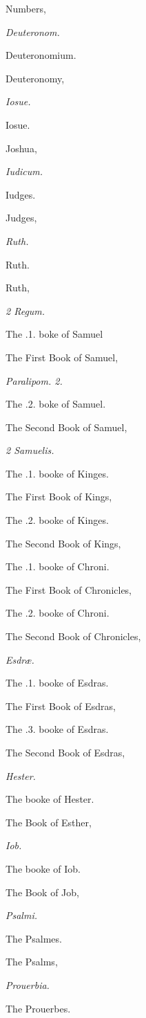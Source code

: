 Numbers,

\emph{Deuteronom.}

Deuteronomium.

Deuteronomy,

\emph{Iosue.}

Iosue.

Joshua,

\emph{Iudicum.}

Iudges.

Judges,

\emph{Ruth.}

Ruth.

Ruth,

\emph{2 Regum.}

The .1. boke of Samuel

The First Book of Samuel,

\emph{Paralipom. 2.}

The .2. boke of Samuel.

The Second Book of Samuel,

\emph{2 Samuelis.}

The .1. booke of Kinges.

The First Book of Kings,

The .2. booke of Kinges.

The Second Book of Kings,

The .1. booke of Chroni.

The First Book of Chronicles,

The .2. booke of Chroni.

The Second Book of Chronicles,

\emph{Esdræ.}

The .1. booke of Esdras.

The First Book of Esdras,

The .3. booke of Esdras.

The Second Book of Esdras,

\emph{Hester.}

The booke of Hester.

The Book of Esther,

\emph{Iob.}

The booke of Iob.

The Book of Job,

\emph{Psalmi.}

The Psalmes.

The Psalms,

\emph{Prouerbia.}

The Prouerbes.

